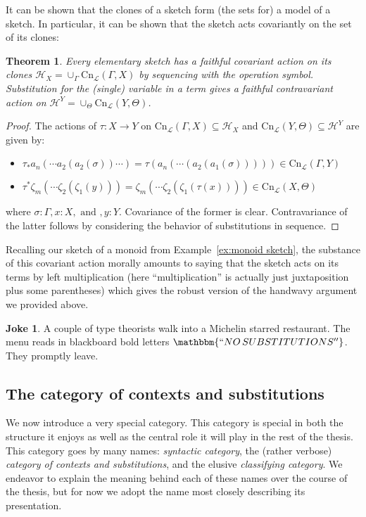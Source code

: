 \documentclass[12pt,twoside]{reedthesis}
\theoremstyle{definition}
\newtheorem{joke}{Joke}
\theoremstyle{remark}
\theoremstyle{plain}
\newtheorem{theorem}{Theorem}
\begin{document}
It can be shown that the clones of a sketch form (the sets for) a model of a
sketch. In particular, it can be shown that the sketch acts covariantly on the
set of its clones:
\begin{theorem}\label{thm:clone model}
  Every elementary sketch has a faithful covariant action on its clones
  \(\mathcal{H}_{X} = \cup_{\Gamma} \text{Cn}_{\mathcal{L}}(\Gamma,X)\) by sequencing with
  the operation symbol. Substitution for the (single) variable in a term gives
  a faithful contravariant action on
  \(\mathcal{H}^{Y} = \cup_{\Theta} \text{Cn}_{\mathcal{L}}(Y,\Theta)\).
\end{theorem}
\begin{proof}
  The actions of \(\tau : X \rightarrow Y\) on
  \(\text{Cn}_{\mathcal{L}} (\Gamma,X) \subseteq \mathcal{H}_{X}\) and
  \(\text{Cn}_{\mathcal{L}} (Y,\Theta) \subseteq \mathcal{H}^{Y}\) are given by:
  \begin{itemize}
    \item \(\tau_{*}a_{n}(\cdots a_{2}(a_{2}(\sigma))\cdots) =
    \tau(a_{n}(\cdots(a_{2}(a_{1}(\sigma))))) \in
    \text{Cn}_{\mathcal{L}}(\Gamma,Y)\)
    \item \(\tau^{*}\zeta_{m}(\cdots \zeta_{2}(\zeta_{1}(y))) =
    \zeta_{m}(\cdots\zeta_{2}(\zeta_{1}(\tau(x)))) \in
    \text{Cn}_{\mathcal{L}}(X,\Theta)\)
  \end{itemize}
  where \(\sigma : \Gamma, x : X, \text { and }, y:Y\). Covariance of the
  former is clear. Contravariance of the latter follows by considering the
  behavior of substitutions in sequence.
\end{proof}

Recalling our sketch of a monoid from Example~\ref{ex:monoid sketch}, the
substance of this covariant action morally amounts to saying that the sketch
acts on its terms by left multiplication (here ``multiplication'' is actually
just juxtaposition plus some parentheses) which gives the robust version of the
handwavy argument we provided above.

\begin{joke}
  A couple of type theorists walk into a Michelin starred restaurant. The menu
  reads in blackboard bold letters $\mathbbm{``NO\, SUBSTITUTIONS''}$. They promptly leave.
\end{joke}

\subsection{The category of contexts and substitutions}
We now introduce a very special category. This category is special in both the
structure it enjoys as well as the central role it will play in the rest of the
thesis. This category goes by many names: \emph{syntactic category}, the (rather
verbose) \emph{category of contexts and substitutions}, and the elusive
\emph{classifying category}. We endeavor to explain the meaning behind each of
these names over the course of the thesis, but for now we adopt the name most
closely describing its presentation.
\end{document}

